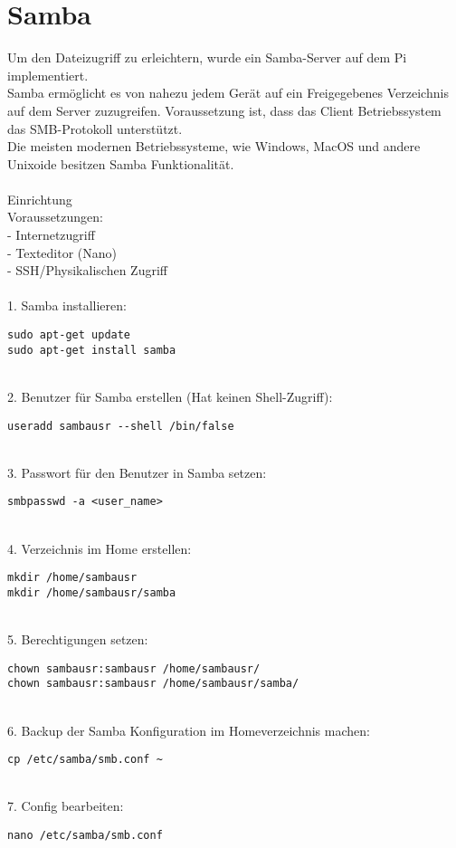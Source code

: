 \section{Samba}
Um den Dateizugriff zu erleichtern, wurde ein Samba-Server auf dem Pi implementiert.\\
Samba ermöglicht es von nahezu jedem Gerät auf ein Freigegebenes Verzeichnis auf dem Server zuzugreifen. Voraussetzung ist, dass das Client Betriebssystem das SMB-Protokoll unterstützt.\\
Die meisten modernen Betriebssysteme, wie Windows, MacOS und andere Unixoide besitzen Samba Funktionalität.\\
~\\
Einrichtung\\
Voraussetzungen:\\
- Internetzugriff\\
- Texteditor (Nano)\\
- SSH/Physikalischen Zugriff\\
\\
1. Samba installieren:
\begin{lstlisting}
sudo apt-get update
sudo apt-get install samba
\end{lstlisting}
~\\
2. Benutzer für Samba erstellen (Hat keinen Shell-Zugriff):
\begin{lstlisting}
useradd sambausr --shell /bin/false
\end{lstlisting}
~\\
3. Passwort für den Benutzer in Samba setzen:
\begin{lstlisting}
smbpasswd -a <user_name>
\end{lstlisting}
~\\
4. Verzeichnis im Home erstellen:
\begin{lstlisting}
mkdir /home/sambausr
mkdir /home/sambausr/samba
\end{lstlisting}
~\\
5. Berechtigungen setzen:
\begin{lstlisting}
chown sambausr:sambausr /home/sambausr/
chown sambausr:sambausr /home/sambausr/samba/
\end{lstlisting}
~\\
6. Backup der Samba Konfiguration im Homeverzeichnis machen:
\begin{lstlisting}
cp /etc/samba/smb.conf ~
\end{lstlisting}
~\\
7. Config bearbeiten:
\begin{lstlisting}
nano /etc/samba/smb.conf
\end{lstlisting}
